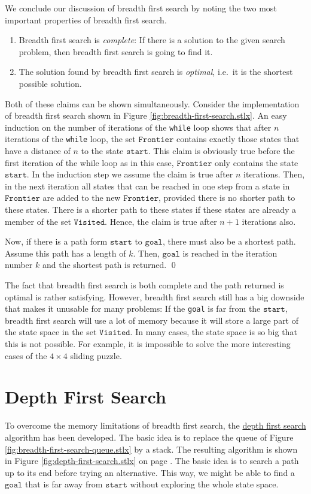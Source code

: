 We conclude our discussion of breadth first search by noting the two most important properties of
breadth first search.
\begin{enumerate}
\item Breadth first search is \emph{\color{blue}complete}:  If there is a solution to the given
      search problem, then breadth first search is going to find it.
\item The solution found by breadth first search is \emph{\color{blue}optimal}, i.e.~it is the
      shortest possible solution.
\end{enumerate}
\proof
Both of these claims can be shown simultaneously.  Consider the implementation of breadth first
search shown in Figure \ref{fig:breadth-first-search.stlx}.  An easy induction on the number of
iterations of the \texttt{while} loop shows that after $n$ iterations of the \texttt{while} loop,
the set $\mathtt{Frontier}$ contains exactly those states that have a distance of $n$ to the state 
$\mathtt{start}$.  This claim is obviously true before the first iteration of the while loop as in
this case, $\mathtt{Frontier}$ only contains the state $\mathtt{start}$.  In the induction step we
assume the claim is true after $n$ iterations.  Then, in the next iteration all states that can be
reached in one step from a state in $\mathtt{Frontier}$ are added to the new $\mathtt{Frontier}$,
provided there is no shorter path to these states.  There is a shorter path to these states if these
states are already a member of the set $\mathtt{Visited}$.  Hence, the claim is true after $n+1$
iterations also.

Now, if there is a path form $\mathtt{start}$ to $\mathtt{goal}$, there must also be a shortest
path.  Assume this path has a length of $k$.  Then, $\mathtt{goal}$ is reached in the iteration
number $k$ and the shortest path is returned.
\qed

The fact that breadth first search is both complete and the path returned is optimal is rather
satisfying.  However, breadth first search still has a big downside that makes it unusable for
many problems:  If the \texttt{goal} is far from the $\mathtt{start}$, breadth first search will use
a lot of memory because it will store a large part of the state space in the set
$\mathtt{Visited}$.  In many cases, the state space is so big that this is not possible.  For example, it is
impossible to solve the more interesting cases of the $4 \times 4$ sliding puzzle.

\section{Depth First Search}
To overcome the memory limitations of breadth first search, the
\href{https://en.wikipedia.org/wiki/Depth-first_search}{depth first search} algorithm has been
developed.  The basic idea is to replace the queue of Figure
\ref{fig:breadth-first-search-queue.stlx} by a stack.  The resulting algorithm is shown in Figure
\ref{fig:depth-first-search.stlx} on page \pageref{fig:depth-first-search.stlx}.  The basic idea is
to search a path up to its end before trying an alternative.  This way, we might be able to find a
$\mathtt{goal}$ that is far away from $\mathtt{start}$ without exploring the whole state space.  

